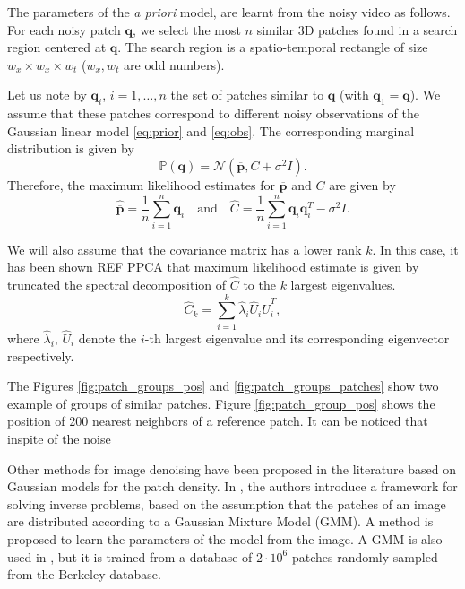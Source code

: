 \documentclass[10pt, journal, twocolumn, final, a4paper]{IEEEtran}
\newcommand{\ma}[1]{\boldsymbol{#1}}
\begin{document}
The parameters of the \textit{a priori} model, are learnt from the noisy video as
follows. For each noisy patch $\ma q$, we select the most $n$
similar 3D patches found in a search region centered at $\ma q$. The
search region is a spatio-temporal rectangle of size $w_x \times
w_x \times w_t$ ($w_x, w_t$ are odd numbers). 

Let us note by $\ma q_i$, $i = 1, \dots, n$ the set of patches
similar to $\ma q$ (with $\ma q_1 = \ma q$). We assume that these 
patches correspond to different noisy observations of the Gaussian linear model
\eqref{eq:prior} and \eqref{eq:obs}. The corresponding marginal distribution is given by
\[\mathds P(\ma q) = \mathcal N(\overline{\ma p}, C + \sigma^2I). \]
Therefore, the maximum likelihood estimates for $\overline{\ma p}$ and $C$ are given by 
\begin{equation}
	\widehat{\overline{\ma p}} = \frac1{n}\sum_{i = 1}^{n}\ma q_i \quad\text{and}\quad 
		\widehat C= \frac1n\sum_{i = 1}^{n}\ma q_i\ma q_i^T - \sigma^2I.
	\label{eq:learn_parameters}
\end{equation}

We will also assume that the covariance matrix has a lower rank $k$.  In this
case, it has been shown REF PPCA that maximum likelihood estimate is given by
truncated the spectral decomposition of $\widehat C$ to the $k$ largest
eigenvalues.
\begin{equation}
\widehat C_k = \sum_{i = 1}^k\widehat \lambda_i\widehat U_i\widehat U_i^T,
\end{equation}
where $\widehat \lambda_i$, $\widehat U_i$ denote the $i$-th largest
eigenvalue and its corresponding eigenvector respectively.

The Figures \ref{fig:patch_groups_pos} and \ref{fig:patch_groups_patches}
show two example of groups of similar patches. Figure \ref{fig:patch_group_pos}
shows the position of 200 nearest neighbors of a reference patch. It can be noticed
that inspite of the noise 


\bigskip

Other methods for image denoising have been proposed in the
literature based on Gaussian models for the patch density. In \cite{Yu2012},
the authors introduce a framework for solving inverse problems, based on the
assumption that the patches of an image are distributed according to a Gaussian
Mixture Model (GMM). A method is proposed to learn the parameters of the model from
the image. A GMM is also used in \cite{Zoran2011}, but it is trained from a
database of $2\cdot 10^6$ patches randomly sampled from the Berkeley database.
\end{document}
